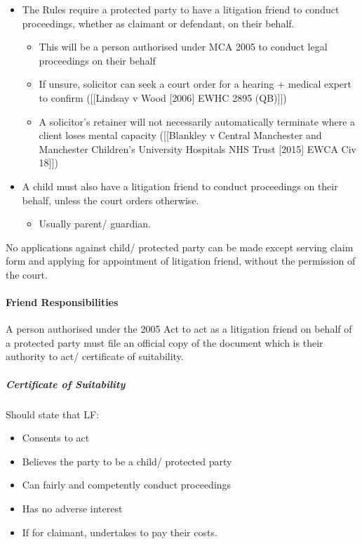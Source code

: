 \documentclass[
]{article}
\providecommand{\tightlist}{%
  \setlength{\itemsep}{0pt}\setlength{\parskip}{0pt}}
\begin{document}
\begin{itemize}
\tightlist
\item
  The Rules require a protected party to have a litigation friend to
  conduct proceedings, whether as claimant or defendant, on their
  behalf.

  \begin{itemize}
  \tightlist
  \item
    This will be a person authorised under MCA 2005 to conduct legal
    proceedings on their behalf
  \item
    If unsure, solicitor can seek a court order for a hearing + medical
    expert to confirm ({[}{[}Lindsay v Wood {[}2006{]} EWHC 2895
    (QB){]}{]})
  \item
    A solicitor's retainer will not necessarily automatically terminate
    where a client loses mental capacity ({[}{[}Blankley v Central
    Manchester and Manchester Children's University Hospitals NHS Trust
    {[}2015{]} EWCA Civ 18{]}{]})
  \end{itemize}
\item
  A child must also have a litigation friend to conduct proceedings on
  their behalf, unless the court orders otherwise.

  \begin{itemize}
  \tightlist
  \item
    Usually parent/ guardian.
  \end{itemize}
\end{itemize}

No applications against child/ protected party can be made except
serving claim form and applying for appointment of litigation friend,
without the permission of the court.

\hypertarget{friend-responsibilities}{%
\paragraph{Friend Responsibilities}\label{friend-responsibilities}}

A person authorised under the 2005 Act to act as a litigation friend on
behalf of a protected party must file an official copy of the document
which is their authority to act/ certificate of suitability.

\hypertarget{certificate-of-suitability}{%
\subparagraph{Certificate of
Suitability}\label{certificate-of-suitability}}

Should state that LF:

\begin{itemize}
\tightlist
\item
  Consents to act
\item
  Believes the party to be a child/ protected party
\item
  Can fairly and competently conduct proceedings
\item
  Has no adverse interest
\item
  If for claimant, undertakes to pay their costs.
\end{itemize}
\end{document}
